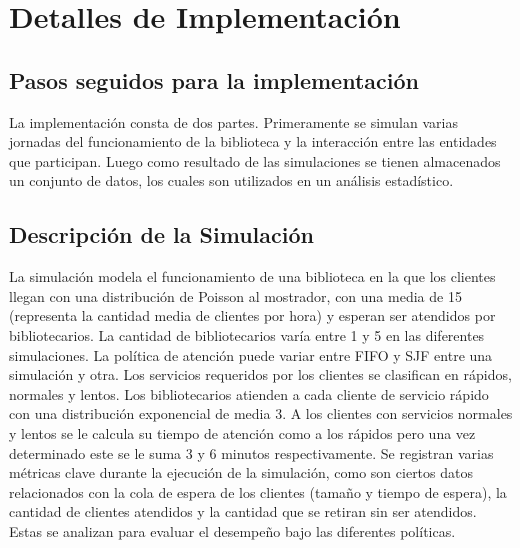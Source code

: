\documentclass[10pt,twocolumn]{article}
\begin{document}

\section{Detalles de Implementación}

\subsection{Pasos seguidos para la implementación}
La implementación consta de dos partes. Primeramente se simulan varias jornadas del funcionamiento de la biblioteca y la interacción entre las entidades que participan. Luego como resultado de las simulaciones se tienen almacenados un conjunto de datos, los cuales son utilizados en un análisis estadístico.

\subsection{Descripción de la Simulación}
La simulación modela el funcionamiento de una biblioteca en la que los clientes llegan con una distribución de Poisson al mostrador, con una media de 15 (representa la cantidad media de clientes por hora) y esperan ser atendidos por bibliotecarios. La cantidad de bibliotecarios varía entre 1 y 5 en las diferentes simulaciones. La política de atención puede variar entre FIFO y SJF entre una simulación y otra. Los servicios requeridos por los clientes se clasifican en rápidos, normales y lentos. Los bibliotecarios atienden a cada cliente de servicio rápido con una distribución exponencial de media 3. A los clientes con servicios normales y lentos se le calcula su tiempo de atención como a los rápidos pero una vez determinado este se le suma 3 y 6 minutos respectivamente.
Se registran varias métricas clave durante la ejecución de la simulación, como son ciertos datos relacionados con la cola de espera de los clientes (tamaño y tiempo de espera), la cantidad de clientes atendidos y la cantidad que se retiran sin ser atendidos. Estas se analizan para evaluar el desempeño bajo las diferentes políticas.





\end{document}
